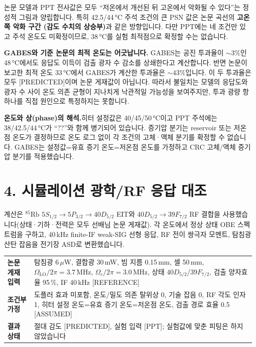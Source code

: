 \documentclass[10pt,a4paper]{article}
\newcommand{\Status}[1]{\textsf{\footnotesize[#1]}}
\newcommand{\warnbox}[1]{%
  \noindent\colorbox{warn}{%
    \parbox{\dimexpr\textwidth-2\fboxsep\relax}{#1}}}
\providecommand{\GabesOptimumTransmissionPct}{3}
\providecommand{\PaperOptimumTransmissionPct}{43}
\providecommand{\AbsoluteSensitivityStatus}{PREDICTED}
\providecommand{\ExperimentalInputStatus}{PPT}
\begin{document}
논문 모델과 PPT 전사값은 모두 ``저온에서 개선된 뒤 고온에서 악화될 수 있다''는 정성적 그림과
양립합니다. 특히 42.5/44\,°C 주석 조건의 큰 PSN 값은 논문 곡선의 \textbf{고온 쪽 악화 구간
(감도 수치의 상승부)}과 같은 방향입니다. 다만 PPT에는 네 조건만 있고 주석 온도도 미확정이므로,
38\,°C를 실험 최적점으로 확정할 수는 없습니다.

\textbf{GABES와 기준 논문의 최적 온도는 어긋납니다.} GABES는 공진 투과율이
\(\sim\GabesOptimumTransmissionPct\%\)인 48\,°C에서도 응답도 이득이 검출 광자 수 감소를 상쇄한다고
계산합니다. 반면 논문이 보고한 최적 온도 33\,°C에서 GABES가 계산한 투과율은
\(\sim\PaperOptimumTransmissionPct\%\)입니다. 이 두 투과율은 모두 \Status{PREDICTED}이며 논문 게재값이
아닙니다. 따라서 불일치는 모델의 응답도와 광자 수 사이 온도 의존 균형이 지나치게 낙관적일 가능성을
보여주지만, 투과 광량 항 하나를 직접 원인으로 특정하지는 못합니다.

\warnbox{\small\textbf{온도와 상(phase)의 해석.}\quad 히터 설정값은 40/45/50\,°C이고 PPT 주석에는
38/42.5/44\,°C가 ``??''와 함께 병기되어 있습니다. 증기압 분기는 reservoir 또는 저온점 온도가
결정하므로 온도 로그 없이 각 조건의 고체·액체 분기를 확정할 수 없습니다. GABES는 설정값=유효 증기
온도=저온점 온도를 가정하고 CRC 고체/액체 증기압 분기를 적용했습니다.}

\section*{4. 시뮬레이션 광학/RF 응답 대조}

계산은 \({}^{85}\mathrm{Rb}\) \(5S_{1/2}\!\rightarrow5P_{3/2}\!\rightarrow40D_{5/2}\) EIT와
\(40D_{5/2}\!\rightarrow39F_{7/2}\) RF 결합을 사용했습니다(상태·기하·전력은 모두 선배님 논문 게재값).
각 온도에서 정상 상태 OBE 스펙트럼을 구하고, 40\,kHz finite-IF weak-SIG 선형 응답, RF 전이 쌍극자 모멘트,
탐침광 산탄 잡음을 전기장 ASD로 변환했습니다.

\begin{tabularx}{\textwidth}{>{\bfseries}p{3.4cm}X}
논문 게재 입력 & 탐침광 6\,$\mu$W, 결합광 30\,mW, 빔 지름 0.15\,mm, 셀 50\,mm,
  \(\Omega_{\mathrm{LO}}/2\pi=3.7\,\mathrm{MHz}\), \(\Omega_c/2\pi=3.0\,\mathrm{MHz}\),
  상태 \(40D_{5/2}\)/\(39F_{7/2}\),
  검출 양자효율 95\,\%, IF 40\,kHz \Status{REFERENCE}\\
조건부 가정 & 도플러 효과 미포함, 온도/밀도 의존 탈위상 0, 기술 잡음 0,
  RF 각도 인자 1, 히터 설정 온도=유효 증기 온도=저온점 온도, 검출 경로 효율 0.5 \Status{ASSUMED}\\
결과 상태 & 절대 감도 \Status{\AbsoluteSensitivityStatus}, 실험 입력 \Status{\ExperimentalInputStatus};
  실험값에 맞춘 피팅은 하지 않았습니다\\
\end{tabularx}
\end{document}
